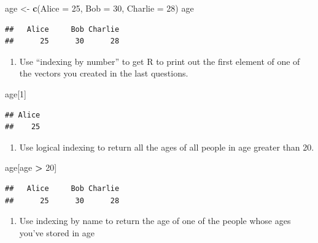 \documentclass[
]{article}
\newenvironment{Shaded}{\begin{snugshade}}{\end{snugshade}}
\newcommand{\AttributeTok}[1]{\textcolor[rgb]{0.13,0.29,0.53}{#1}}
\newcommand{\DecValTok}[1]{\textcolor[rgb]{0.00,0.00,0.81}{#1}}
\newcommand{\FunctionTok}[1]{\textcolor[rgb]{0.13,0.29,0.53}{\textbf{#1}}}
\newcommand{\NormalTok}[1]{#1}
\newcommand{\OtherTok}[1]{\textcolor[rgb]{0.56,0.35,0.01}{#1}}
\newcommand{\SpecialCharTok}[1]{\textcolor[rgb]{0.81,0.36,0.00}{\textbf{#1}}}
\providecommand{\tightlist}{%
  \setlength{\itemsep}{0pt}\setlength{\parskip}{0pt}}
\begin{document}
\begin{Shaded}
\begin{Highlighting}[]
\NormalTok{age }\OtherTok{\textless{}{-}} \FunctionTok{c}\NormalTok{(}\AttributeTok{Alice =} \DecValTok{25}\NormalTok{, }\AttributeTok{Bob =} \DecValTok{30}\NormalTok{, }\AttributeTok{Charlie =} \DecValTok{28}\NormalTok{)}
\NormalTok{age}
\end{Highlighting}
\end{Shaded}

\begin{verbatim}
##   Alice     Bob Charlie 
##      25      30      28
\end{verbatim}

\begin{enumerate}
\def\labelenumi{\arabic{enumi}.}
\setcounter{enumi}{9}
\tightlist
\item
  Use ``indexing by number'' to get R to print out the first element of
  one of the vectors you created in the last questions.
\end{enumerate}

\begin{Shaded}
\begin{Highlighting}[]
\NormalTok{age[}\DecValTok{1}\NormalTok{]}
\end{Highlighting}
\end{Shaded}

\begin{verbatim}
## Alice 
##    25
\end{verbatim}

\begin{enumerate}
\def\labelenumi{\arabic{enumi}.}
\setcounter{enumi}{10}
\tightlist
\item
  Use logical indexing to return all the ages of all people in age
  greater than 20.
\end{enumerate}

\begin{Shaded}
\begin{Highlighting}[]
\NormalTok{age[age }\SpecialCharTok{\textgreater{}} \DecValTok{20}\NormalTok{]}
\end{Highlighting}
\end{Shaded}

\begin{verbatim}
##   Alice     Bob Charlie 
##      25      30      28
\end{verbatim}

\begin{enumerate}
\def\labelenumi{\arabic{enumi}.}
\setcounter{enumi}{11}
\tightlist
\item
  Use indexing by name to return the age of one of the people whose ages
  you've stored in age
\end{enumerate}
\end{document}
